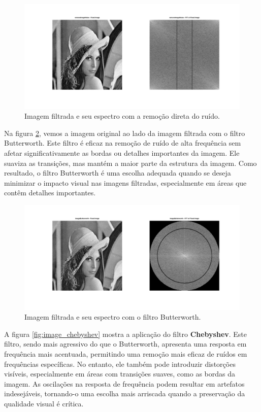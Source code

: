 \begin{figure}[H]
    \centering
    \includegraphics[width=1\linewidth]{03_results/assets/image_direct_remove_noise.png}
    \caption{Imagem filtrada e seu espectro com a remoção direta do ruído.}
    \label{fig:image_direct_remove_noise}
\end{figure}

Na figura \ref{fig:image_butterworth}, vemos a imagem original ao lado da imagem filtrada com o filtro Butterworth. Este filtro é eficaz na remoção de ruído de alta frequência sem afetar significativamente as bordas ou detalhes importantes da imagem. Ele suaviza as transições, mas mantém a maior parte da estrutura da imagem. Como resultado, o filtro Butterworth é uma escolha adequada quando se deseja minimizar o impacto visual nas imagens filtradas, especialmente em áreas que contêm detalhes importantes.

\begin{figure}[H]
    \centering
    \includegraphics[width=1\linewidth]{03_results/assets/image_butterworth.png}
    \caption{Imagem filtrada e seu espectro com o filtro Butterworth.}
    \label{fig:image_butterworth}
\end{figure}

A figura \ref{fig:image_chebyshev} mostra a aplicação do filtro \textbf{Chebyshev}. Este filtro, sendo mais agressivo do que o Butterworth, apresenta uma resposta em frequência mais acentuada, permitindo uma remoção mais eficaz de ruídos em frequências específicas. No entanto, ele também pode introduzir distorções visíveis, especialmente em áreas com transições suaves, como as bordas da imagem. As oscilações na resposta de frequência podem resultar em artefatos indesejáveis, tornando-o uma escolha mais arriscada quando a preservação da qualidade visual é crítica.

